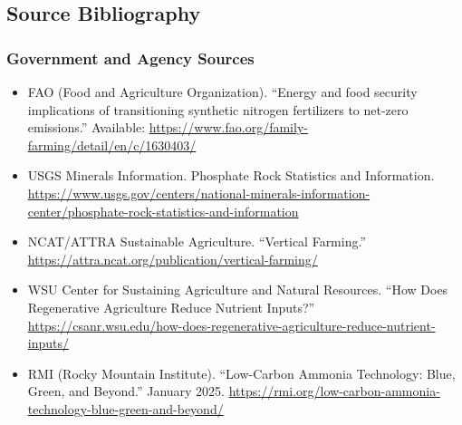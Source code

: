 \documentclass[11pt,letterpaper]{article}
\begin{document}
\subsection{Source Bibliography}

\subsubsection{Government and Agency Sources}
\begin{itemize}[leftmargin=1.5em]
  \item FAO (Food and Agriculture Organization). ``Energy and food security implications of transitioning synthetic nitrogen fertilizers to net-zero emissions.'' Available: \url{https://www.fao.org/family-farming/detail/en/c/1630403/}
  \item USGS Minerals Information. Phosphate Rock Statistics and Information. \url{https://www.usgs.gov/centers/national-minerals-information-center/phosphate-rock-statistics-and-information}
  \item NCAT/ATTRA Sustainable Agriculture. ``Vertical Farming.'' \url{https://attra.ncat.org/publication/vertical-farming/}
  \item WSU Center for Sustaining Agriculture and Natural Resources. ``How Does Regenerative Agriculture Reduce Nutrient Inputs?'' \url{https://csanr.wsu.edu/how-does-regenerative-agriculture-reduce-nutrient-inputs/}
  \item RMI (Rocky Mountain Institute). ``Low-Carbon Ammonia Technology: Blue, Green, and Beyond.'' January 2025. \url{https://rmi.org/low-carbon-ammonia-technology-blue-green-and-beyond/}
\end{itemize}
\end{document}
